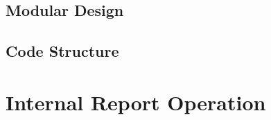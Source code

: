\documentclass[10pt,a4paper]{report}
\begin{document}
\section{Modular Design}

\section{Code Structure}


\chapter{Internal Report Operation}
\end{document}
